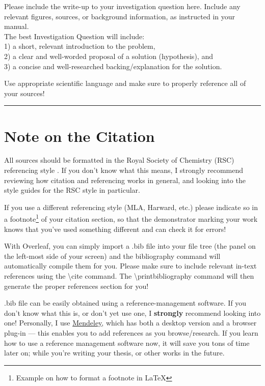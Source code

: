 \documentclass[twocolumn]{article} %
\begin{document}
Please include the write-up to your investigation question here. Include any relevant figures, sources, or background information, as instructed in your manual.
\\
The best Investigation Question will include:
\\1) a short, relevant introduction to the problem,
\\2) a clear and well-worded proposal of a solution (hypothesis), and 
\\3) a concise and well-researched backing/explanation for the solution. 

Use appropriate scientific language and make sure to properly reference all of your sources!

\vspace{8mm}
\hrule


\section*{Note on the Citation} %
All sources should be formatted in the Royal Society of Chemistry (RSC) referencing style \cite{Example}. If you don't know what this means, I strongly recommend reviewing how citation and referencing works in general, and looking into the style guides for the RSC style in particular. 

If you use a different referencing style (MLA, Harward, etc.) please indicate so in a footnote\footnote{Example on how to format a footnote in \LaTeX{}} of your citation section, so that the demonstrator marking your work knows that you've used something different and can check it for errors!

With Overleaf, you can simply import a .bib file into your file tree (the panel on the left-most side of your screen) and the bibliography command will automatically compile them for you. Please make sure to include relevant in-text references using the \textbackslash cite command.
The \textbackslash printbibliography command will then generate the proper references section for you!

.bib file can be easily obtained using a reference-management software. If you don't know what this is, or don't yet use one, I \textbf{strongly} recommend looking into one! Personally, I use \href{https://www.mendeley.com/reference-management/reference-manager}{Mendeley}, which has both a desktop version and a browser plug-in — this enables you to add references as you browse/research. If you learn how to use a reference management software now, it will save you tons of time later on; while you're writing your thesis, or other works in the future.
\end{document}
